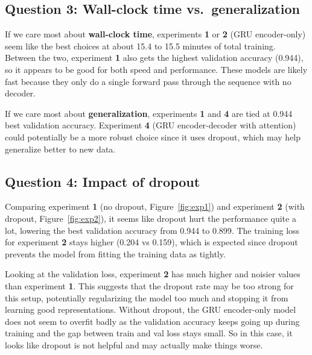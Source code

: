 \documentclass{article}
\begin{document}
\subsection*{Question 3: Wall-clock time vs.\ generalization}

If we care most about \textbf{wall-clock time}, experiments \textbf{1} or \textbf{2} (GRU encoder-only) seem like the best choices at about 15.4 to 15.5 minutes of total training. Between the two, experiment \textbf{1} also gets the highest validation accuracy (0.944), so it appears to be good for both speed and performance. These models are likely fast because they only do a single forward pass through the sequence with no decoder.

If we care most about \textbf{generalization}, experiments \textbf{1} and \textbf{4} are tied at 0.944 best validation accuracy. Experiment \textbf{4} (GRU encoder-decoder with attention) could potentially be a more robust choice since it uses dropout, which may help generalize better to new data.

\subsection*{Question 4: Impact of dropout}

Comparing experiment \textbf{1} (no dropout, Figure~\ref{fig:exp1}) and experiment \textbf{2} (with dropout, Figure~\ref{fig:exp2}), it seems like dropout hurt the performance quite a lot, lowering the best validation accuracy from 0.944 to 0.899. The training loss for experiment \textbf{2} stays higher (0.204 vs 0.159), which is expected since dropout prevents the model from fitting the training data as tightly.

Looking at the validation loss, experiment \textbf{2} has much higher and noisier values than experiment \textbf{1}. This suggests that the dropout rate may be too strong for this setup, potentially regularizing the model too much and stopping it from learning good representations. Without dropout, the GRU encoder-only model does not seem to overfit badly as the validation accuracy keeps going up during training and the gap between train and val loss stays small. So in this case, it looks like dropout is not helpful and may actually make things worse.

\end{document}

